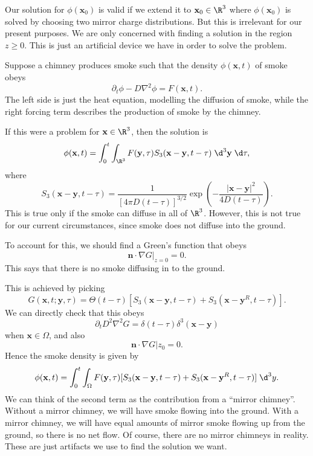 \documentclass[a4paper]{article}
\begin{document}
\begin{eg}
  \begin{center}
  \end{center}
  Our solution for $\phi(\mathbf{x}_0)$ is valid if we extend it to $\mathbf{x}_0 \in \R^3$ where $\phi(\mathbf{x}_0)$ is solved by choosing two mirror charge distributions. But this is irrelevant for our present purposes. We are only concerned with finding a solution in the region $z \geq 0$. This is just an artificial device we have in order to solve the problem.
\end{eg}

\begin{eg}
  Suppose a chimney produces smoke such that the density $\phi(\mathbf{x}, t)$ of smoke obeys
  \[
    \partial_t \phi - D \nabla^2 \phi = F(\mathbf{x}, t).
  \]
  The left side is just the heat equation, modelling the diffusion of smoke, while the right forcing term describes the production of smoke by the chimney.

  If this were a problem for $\mathbf{x} \in \R^3$, then the solution is
  \[
    \phi(\mathbf{x}, t) = \int_0^t \int_{\R^3} F(\mathbf{y}, \tau)S_3(\mathbf{x} - \mathbf{y}, t - \tau)\;\d^3 \mathbf{y}\;\d \tau,
  \]
  where
  \[
    S_3(\mathbf{x} - \mathbf{y}, t - \tau) = \frac{1}{[4\pi D (t - \tau)]^{3/2}} \exp\left(-\frac{|\mathbf{x} - \mathbf{y}|^2}{4D (t - \tau)}\right).
  \]
  This is true only if the smoke can diffuse in all of $\R^3$. However, this is not true for our current circumstances, since smoke does not diffuse into the ground.

  To account for this, we should find a Green's function that obeys
  \[
    \mathbf{n}\cdot \nabla G|_{z = 0} = 0.
  \]
  This says that there is no smoke diffusing in to the ground.

  This is achieved by picking
  \[
    G(\mathbf{x}, t; \mathbf{y}, \tau) = \Theta(t - \tau) [S_3(\mathbf{x} - \mathbf{y}, t - \tau) + S_3(\mathbf{x} - \mathbf{y}^R, t - \tau)].
  \]
  We can directly check that this obeys
  \[
    \partial_t D^2 \nabla^2 G = \delta (t - \tau) \delta^3(\mathbf{x} - \mathbf{y})
  \]
  when $\mathbf{x} \in \Omega$, and also
  \[
    \mathbf{n}\cdot \nabla G|z_0 = 0.
  \]
  Hence the smoke density is given by
  \[
    \phi(\mathbf{x}, t) = \int_0^t \int_\Omega F(\mathbf{y}, \tau) [S_3(\mathbf{x} - \mathbf{y}, t - \tau) + S_3(\mathbf{x} - \mathbf{y}^R, t - \tau)]\;\d^3 y.
  \]
  We can think of the second term as the contribution from a ``mirror chimney''. Without a mirror chimney, we will have smoke flowing into the ground. With a mirror chimney, we will have equal amounts of mirror smoke flowing up from the ground, so there is no net flow. Of course, there are no mirror chimneys in reality. These are just artifacts we use to find the solution we want.
\end{eg}
\end{document}

